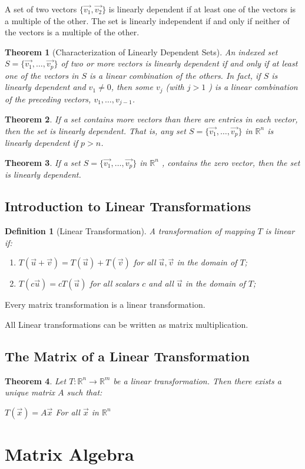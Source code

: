 \documentclass[oneside]{report}
\newtheorem{theorem}{Theorem}[section]
\newtheorem{definition}{Definition}[section]
\begin{document}
A set of two vectors $\{\vec{v_1},\vec{v_2}\}$ is linearly dependent if at least one of the vectors is a multiple of the other. The set is linearly independent if and only if neither of the
vectors is a multiple of the other.

\begin{theorem}[Characterization of Linearly Dependent Sets]
  An indexed set $S = \{\vec{v_1}, \dots , \vec{v_p}\}$ of two or more vectors is linearly dependent if and only if at least one of the vectors in $S$ is a linear combination of the others. In
  fact, if $S$ is linearly dependent and $v_1 \neq 0$, then some $v_j$ (with $j > 1$ ) is a linear
  combination of the preceding vectors, $v_1, \dots, v_{j-1}$.
\end{theorem}

\begin{theorem}
  If a set contains more vectors than there are entries in each vector, then the set
is linearly dependent. That is, any set $S = \{\vec{v_1}, \dots , \vec{v_p}\}$ in $\mathbb{R}^n$ is linearly dependent if $p > n$.
\end{theorem}

\begin{theorem}
  If a set $S = \{\vec{v_1}, \dots , \vec{v_p}\}$ in $\mathbb{R}^n$ , contains the zero vector, then the set is linearly dependent.
\end{theorem}

\section{Introduction to Linear Transformations}

\begin{definition}[Linear Transformation]
  A transformation of mapping $T$ is linear if:
  \begin{enumerate}
    \item $T(\vec{u} + \vec{v}) = T(\vec{u}) + T(\vec{v})$ for all $\vec{u}, \vec{v}$ in the domain of $T$;
    \item $T(c\vec{u}) = cT(\vec{u})$ for all scalars $c$ and all $\vec{u}$ in the domain of $T$;
  \end{enumerate}
\end{definition}

Every matrix transformation is a linear transformation.

All Linear transformations can be written as matrix multiplication.

\section{The Matrix of a Linear Transformation}

\begin{theorem}
  Let $T:\mathbb{R}^n \rightarrow \mathbb{R}^m$ be a linear transformation. Then there exists a unique matrix
$A$ such that:
\begin{center}
  $T(\vec{x})=A\vec{x}$ For all $\vec{x}$ in $\mathbb{R}^n$
\end{center}
\end{theorem}

\chapter{Matrix Algebra}
\end{document}
